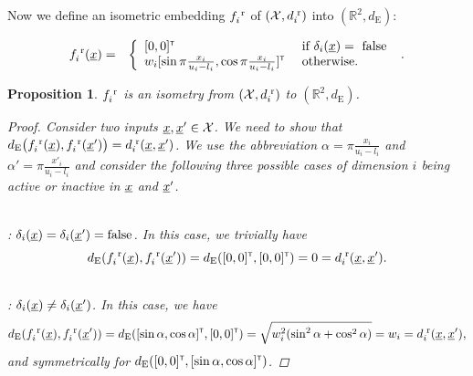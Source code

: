 \documentclass[letterpaper]{article}
\newcommand{\vect}[1]{\underline{\smash{#1}}}
\renewcommand{\v}[1]{\vect{#1}}
\newcommand{\reals}{\mathds{R}}
\newcommand{\sX}{\mathcal{X}}
\newcommand{\br}{^{\text{\textnormal{ r}}}}
\newcommand\transpose{{\textrm{\tiny{\sf{T}}}}}
\newtheorem{prop}[thm]{Proposition}
\begin{document}
Now we define an isometric embedding $f_i\br$ of $(\sX, d\br_i)$ into $(\reals^{2},d_{\text{E}})$:

\begin{eqnarray}
\nonumber{}f_i\br(\v{x}) & = & \left\{\begin{array}{ll}
[0,0]^\transpose & \textrm{ if } \delta_i(\v{x}) = \textrm{ false }\\
\nonumber{} w_i [\sin{\pi\frac{x_i}{u_i-l_i}}, \cos{\pi\frac{x_i}{u_i-l_i}}]^\transpose & \textrm{ otherwise.}\end{array}\right..
\end{eqnarray}

\begin{prop}$f_i\br$ is an isometry from $(\sX, d\br_i)$ to $(\reals^2, d_{{\text{E}}})$.
\label{prop:f_d_cont_isometric}
\begin{proof}
Consider two inputs $\v{x},\v{x}' \in \sX$. We need to show that $d_{\text{E}}\bigl(f_i\br(\v{x}),f_i\br(\v{x}')\bigr) = d\br_i(\v{x},\v{x}')$.
We use the abbreviation $\alpha = \pi\frac{x_i}{u_i-l_i}$ and $\alpha' = \pi\frac{x'_i}{u_i-l_i}$ and consider the following three possible cases of dimension $i$ being active or inactive in $\v{x}$ and $\v{x}'$.

~\\: $\delta_i(\v{x}) = \delta_i(\v{x}') = \textrm{false}$.
In this case, we trivially have 
\[d_{\text{E}}(f_i\br(\v{x}),f_i\br(\v{x}')) = d_{\text{E}}([0,0]^\transpose, [0,0]^\transpose) = 0 = d\br_i(\v{x},\v{x}').\]

~\\: $\delta_i(\v{x}) \neq \delta_i(\v{x}')$. In this case, we have
\[d_{\text{E}}(f_i\br(\v{x}),f_i\br(\v{x}')) = d_{\text{E}}([\sin{\alpha}, \cos{\alpha}]^\transpose, [0,0]^\transpose) = \sqrt{w_i^2 (\sin^2{\alpha} + \cos^2{\alpha})} = w_i = d\br_i(\v{x},\v{x}'),\]
and symmetrically for $d_{\text{E}}([0,0]^\transpose, [\sin{\alpha}, \cos{\alpha}]^\transpose)$.


\end{proof}
\end{prop}
\end{document}
